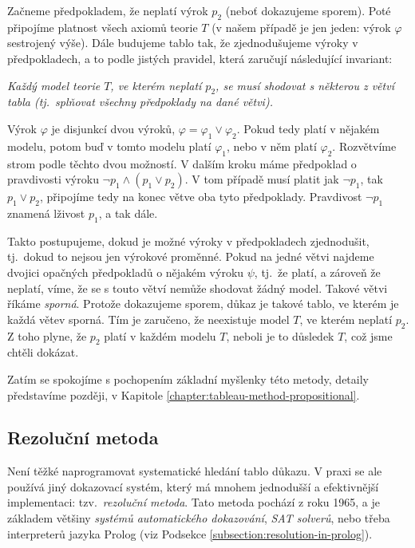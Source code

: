 Začneme předpokladem, že neplatí výrok \(p_2\) (neboť dokazujeme sporem). Poté připojíme platnost všech axiomů teorie \(T\) (v našem případě je jen jeden: výrok \( \varphi \) sestrojený výše). Dále budujeme tablo tak, že zjednodušujeme výroky v předpokladech, a to podle jistých pravidel, která zaručují následující invariant: 

\begin{tcolorbox}
\emph{Každý model teorie \(T\), ve kterém neplatí \(p_2\), se musí \emph{shodovat} s některou z větví tabla (tj.\ splňovat všechny předpoklady na dané větvi).} 
\end{tcolorbox}

Výrok \( \varphi \) je disjunkcí dvou výroků, \( \varphi = \varphi_1 \lor \varphi_2 \). Pokud tedy platí v nějakém modelu, potom buď v tomto modelu platí \( \varphi_1 \), nebo v něm platí \( \varphi_2 \). Rozvětvíme strom podle těchto dvou možností. V dalším kroku máme předpoklad o pravdivosti výroku \( \neg p_1 \land (p_1 \lor p_2) \). V tom případě musí platit jak \( \neg p_1 \), tak \( p_1 \lor p_2 \), připojíme tedy na konec větve oba tyto předpoklady. Pravdivost \( \neg p_1 \) znamená lživost \( p_1 \), a tak dále.

Takto postupujeme, dokud je možné výroky v předpokladech zjednodušit, tj.\ dokud to nejsou jen výrokové proměnné. Pokud na jedné větvi najdeme dvojici opačných předpokladů o nějakém výroku \( \psi \), tj.\ že platí, a zároveň že neplatí, víme, že se s touto větví nemůže shodovat žádný model. Takové větvi říkáme \emph{sporná}.  Protože dokazujeme sporem, důkaz je takové tablo, ve kterém je každá větev sporná. Tím je zaručeno, že neexistuje model \(T\), ve kterém neplatí \(p_2\). Z toho plyne, že \(p_2\) platí v každém modelu \(T\), neboli je to důsledek \(T\), což jsme chtěli dokázat.

Zatím se spokojíme s pochopením základní myšlenky této metody, detaily představíme později, v Kapitole \ref{chapter:tableau-method-propositional}.
 

\subsection{Rezoluční metoda}

Není těžké naprogramovat systematické hledání tablo důkazu. V praxi se ale používá jiný dokazovací systém, který má mnohem jednodušší a efektivnější implementaci: tzv.\ \emph{rezoluční metoda}. Tato metoda pochází z roku 1965, a je základem většiny \emph{systémů automatického dokazování}, \emph{SAT solverů}, nebo třeba interpreterů jazyka Prolog (viz Podsekce \ref{subsection:resolution-in-prolog}).

